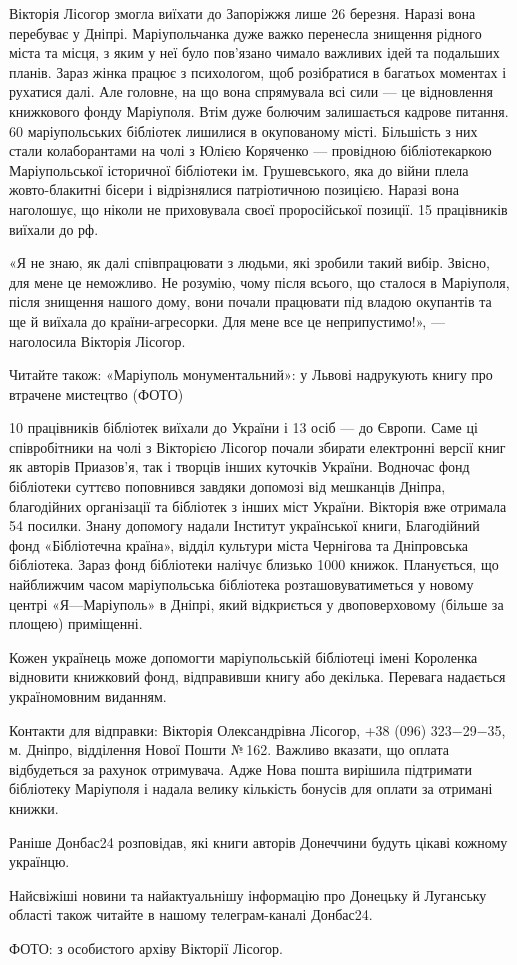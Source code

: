 Вікторія Лісогор змогла виїхати до Запоріжжя лише 26 березня. Наразі вона
перебуває у Дніпрі. Маріупольчанка дуже важко перенесла знищення рідного міста
та місця, з яким у неї було пов’язано чимало важливих ідей та подальших планів.
Зараз жінка працює з психологом, щоб розібратися в багатьох моментах і рухатися
далі. Але головне, на що вона спрямувала всі сили — це відновлення книжкового
фонду Маріуполя. Втім дуже болючим залишається кадрове питання. 60%
маріупольських бібліотек лишилися в окупованому місті. Більшість з них стали
колаборантами на чолі з Юлією Коряченко — провідною бібліотекаркою
Маріупольської історичної бібліотеки ім. Грушевського, яка до війни плела
жовто-блакитні бісери і відрізнялися патріотичною позицією. Наразі вона
наголошує, що ніколи не приховувала своєї проросійської позиції. 15 працівників
виїхали до рф.

«Я не знаю, як далі співпрацювати з людьми, які зробили такий вибір. Звісно,
для мене це неможливо. Не розумію, чому після всього, що сталося в Маріуполя,
після знищення нашого дому, вони почали працювати під владою окупантів та ще й
виїхала до країни-агресорки. Для мене все це неприпустимо!», — наголосила
Вікторія Лісогор.

Читайте також: «Маріуполь монументальний»: у Львові надрукують книгу про
втрачене мистецтво (ФОТО)

10 працівників бібліотек виїхали до України і 13 осіб — до Європи. Саме ці
співробітники на чолі з Вікторією Лісогор почали збирати електронні версії книг
як авторів Приазов’я, так і творців інших куточків України. Водночас фонд
бібліотеки суттєво поповнився завдяки допомозі від мешканців Дніпра,
благодійних організації та бібліотек з інших міст України. Вікторія вже
отримала 54 посилки. Знану допомогу надали Інститут української книги,
Благодійний фонд «Бібліотечна країна», відділ культури міста Чернігова та
Дніпровська бібліотека. Зараз фонд бібліотеки налічує близько 1000 книжок.
Планується, що найближчим часом маріупольська бібліотека розташовуватиметься у
новому центрі «Я—Маріуполь» в Дніпрі, який відкриється у двоповерховому (більше
за площею) приміщенні.

Кожен українець може допомогти маріупольській бібліотеці імені Короленка
відновити книжковий фонд, відправивши книгу або декілька. Перевага надається
україномовним виданням.

Контакти для відправки: Вікторія Олександрівна Лісогор, +38 (096) 323−29−35, м.
Дніпро, відділення Нової Пошти № 162. Важливо вказати, що оплата відбудеться за
рахунок отримувача. Адже Нова пошта вирішила підтримати бібліотеку Маріуполя і
надала велику кількість бонусів для оплати за отримані книжки.

Раніше Донбас24 розповідав, які книги авторів Донеччини будуть цікаві кожному
українцю.

Найсвіжіші новини та найактуальнішу інформацію про Донецьку й Луганську області
також читайте в нашому телеграм-каналі Донбас24.

ФОТО: з особистого архіву Вікторії Лісогор.

